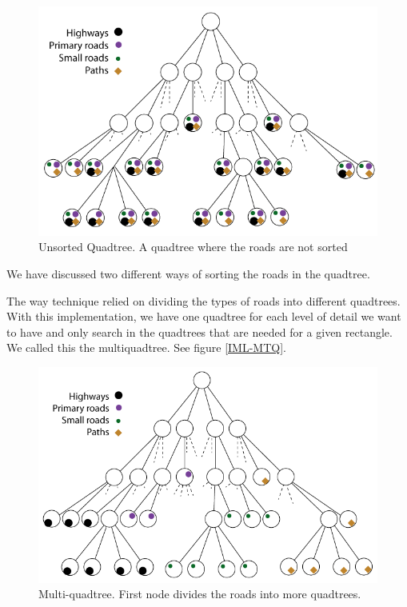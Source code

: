 \begin{figure}[h!]
\centering
\includegraphics[width=1\linewidth]{images/UnsortedQuadtree.png}
\caption{Unsorted Quadtree. A quadtree where the roads are not sorted}
\label{IMPL-USQ}
\end{figure}

We have discussed two different ways of sorting the roads in the quadtree. 

The way technique relied on dividing the types of roads into different
quadtrees. With this implementation, we have one quadtree for each level of
detail we want to have and only search in the quadtrees that are needed for a
given rectangle. We called this the multiquadtree. See figure \ref{IML-MTQ}.

\begin{figure}[h!]
\centering
\includegraphics[width=1\linewidth]{images/MultiQuadtree.png}
\caption{Multi-quadtree. First node divides the roads into more
quadtrees.}
\label{IMPL-MTQ}
\end{figure}

